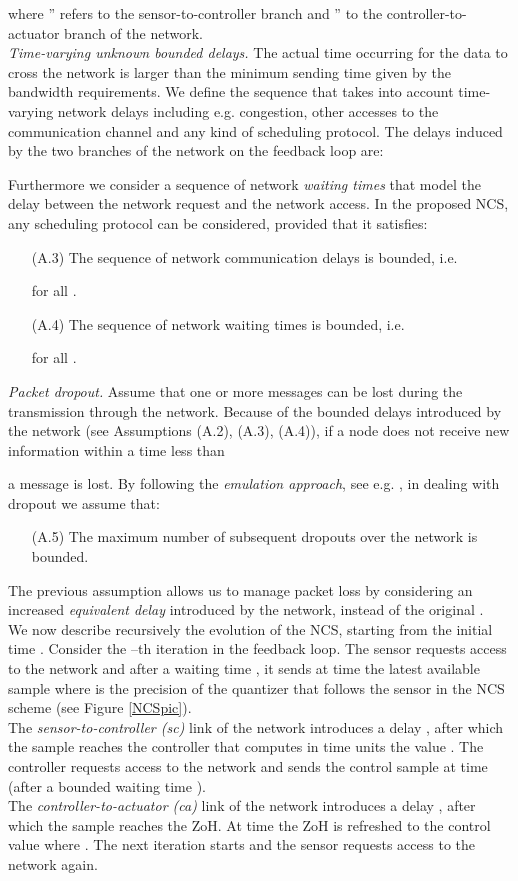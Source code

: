 \documentclass{amsart}
\begin{document}
where '' refers to the sensor-to-controller branch and '' to the controller-to-actuator branch of the network.\\

\textit{Time-varying unknown bounded delays.} The actual time occurring for the data to cross the network is larger than the minimum sending time given by the bandwidth requirements. We define the sequence  that takes into account time-varying network delays including e.g. congestion, other accesses to the communication channel and any kind of scheduling protocol. The delays induced by the two branches of the network on the feedback loop are:

Furthermore we consider a sequence  of network \emph{waiting times} that model the delay between the network request and the network access. In the proposed NCS, any scheduling protocol can be considered, provided that it satisfies: 
\begin{itemize}
\item[(A.3)] The sequence of network communication delays is bounded, i.e. 

for all .
\item[(A.4)] The sequence of network waiting times is bounded, i.e.

for all .
\end{itemize}

\textit{Packet dropout.} Assume that one or more messages can be lost during the transmission through the network. Because of the bounded delays introduced by the network (see Assumptions (A.2), (A.3), (A.4)), if a node does not receive new information within a time less than

a message is lost. By following the \emph{emulation approach}, see e.g. \cite{HeemelsSurvey}, in dealing with dropout we assume that: 
\begin{itemize}
\item[(A.5)] The maximum number of subsequent dropouts over the network is bounded.
\end{itemize}
The previous assumption allows us to manage packet loss by considering an increased \emph{equivalent delay}  introduced by the network, instead of the original . \\

We now describe recursively the evolution of the NCS, starting from the initial time . Consider the --th iteration in the feedback loop. 
The sensor requests access to the network and after a waiting time , it sends at time  the latest available sample  where  is the precision of the quantizer that follows the sensor in the NCS scheme (see Figure \ref{NCSpic}). \\
The \emph{sensor-to-controller (sc)} link of the network introduces a delay , after which the sample reaches the controller that computes in  time units the value . The controller requests access to the network and sends the control sample  at time  (after a bounded waiting time ). \\
The \emph{controller-to-actuator (ca)} link of the network introduces a delay , after which the sample reaches the ZoH. At time  the ZoH is refreshed to the control value  where . The next iteration starts and the sensor requests access to the network again.
\end{document}
